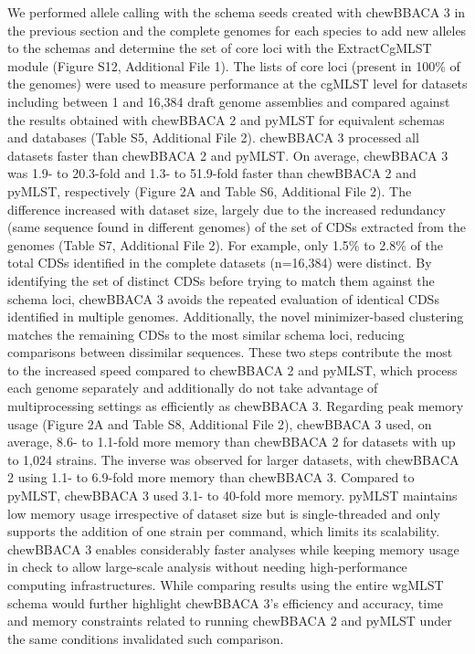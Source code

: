 We performed allele calling with the schema seeds created with chewBBACA 3 in the previous section and the complete genomes for each species to add new alleles to the schemas and determine the set of core loci with the ExtractCgMLST module (Figure S12, Additional File 1). The lists of core loci (present in 100\% of the genomes) were used to measure performance at the cgMLST level for datasets including between 1 and 16,384 draft genome assemblies and compared against the results obtained with chewBBACA 2 and pyMLST \citep{biguenet_introduction_2023} for equivalent schemas and databases (Table S5, Additional File 2). chewBBACA 3 processed all datasets faster than chewBBACA 2 and pyMLST. On average, chewBBACA 3 was 1.9- to 20.3-fold and 1.3- to 51.9-fold faster than chewBBACA 2 and pyMLST, respectively (Figure 2A and Table S6, Additional File 2). The difference increased with dataset size, largely due to the increased redundancy (same sequence found in different genomes) of the set of CDSs extracted from the genomes (Table S7, Additional File 2). For example, only 1.5\% to 2.8\% of the total CDSs identified in the complete datasets (n=16,384) were distinct. By identifying the set of distinct CDSs before trying to match them against the schema loci, chewBBACA 3 avoids the repeated evaluation of identical CDSs identified in multiple genomes. Additionally, the novel minimizer-based clustering matches the remaining CDSs to the most similar schema loci, reducing comparisons between dissimilar sequences. These two steps contribute the most to the increased speed compared to chewBBACA 2 and pyMLST, which process each genome separately and additionally do not take advantage of multiprocessing settings as efficiently as chewBBACA 3. Regarding peak memory usage (Figure 2A and Table S8, Additional File 2), chewBBACA 3 used, on average, 8.6- to 1.1-fold more memory than chewBBACA 2 for datasets with up to 1,024 strains. The inverse was observed for larger datasets, with chewBBACA 2 using 1.1- to 6.9-fold more memory than chewBBACA 3. Compared to pyMLST, chewBBACA 3 used 3.1- to 40-fold more memory. pyMLST maintains low memory usage irrespective of dataset size but is single-threaded and only supports the addition of one strain per command, which limits its scalability. chewBBACA 3 enables considerably faster analyses while keeping memory usage in check to allow large-scale analysis without needing high-performance computing infrastructures. While comparing results using the entire wgMLST schema would further highlight chewBBACA 3’s efficiency and accuracy, time and memory constraints related to running chewBBACA 2 and pyMLST under the same conditions invalidated such comparison.
